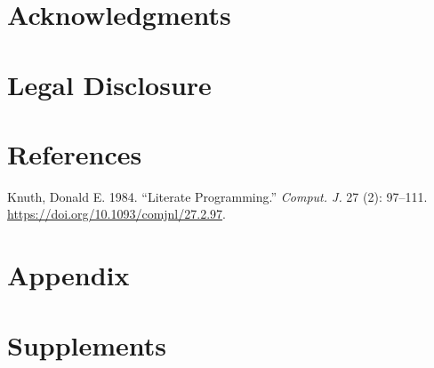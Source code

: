 \documentclass[
  letterpaper,
  DIV=11,
  numbers=noendperiod]{scrartcl}
\newlength{\cslhangindent}
\newenvironment{CSLReferences}[2] %
 {\begin{list}{}{%
  \setlength{\itemindent}{0pt}
  \setlength{\leftmargin}{0pt}
  \setlength{\parsep}{0pt}
  \ifodd #1
   \setlength{\leftmargin}{\cslhangindent}
   \setlength{\itemindent}{-1\cslhangindent}
  \fi
  \setlength{\itemsep}{#2\baselineskip}}}
 {\end{list}}
\begin{document}
\section{Acknowledgments}\label{acknowledgments}

\section{Legal Disclosure}\label{legal-disclosure}

\section*{References}\label{references}

\label{refs}
\begin{CSLReferences}{1}{0}
Knuth, Donald E. 1984. {``Literate Programming.''} \emph{Comput. J.} 27
(2): 97--111. \url{https://doi.org/10.1093/comjnl/27.2.97}.

\end{CSLReferences}

\section{Appendix}\label{appendix}

\section{Supplements}\label{supplements}
\end{document}
